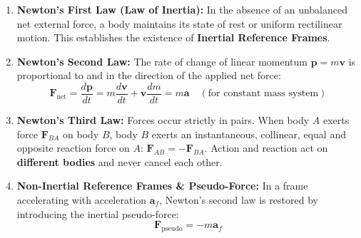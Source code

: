 \documentclass[10pt,twoside,openright]{book}
\begin{document}
\begin{conceptbox}
\begin{enumerate}[leftmargin=*]
  \item \textbf{Newton's First Law (Law of Inertia):} In the absence of an unbalanced net external force, a body maintains its state of rest or uniform rectilinear motion. This establishes the existence of \textbf{Inertial Reference Frames}.
  \item \textbf{Newton's Second Law:} The rate of change of linear momentum $\mathbf{p} = m\mathbf{v}$ is proportional to and in the direction of the applied net force:
  \begin{equation}
    \mathbf{F}_{\text{net}} = \frac{d\mathbf{p}}{dt} = m\frac{d\mathbf{v}}{dt} + \mathbf{v}\frac{dm}{dt} = m\mathbf{a} \quad (\text{for constant mass system})
  \end{equation}
  \item \textbf{Newton's Third Law:} Forces occur strictly in pairs. When body $A$ exerts force $\mathbf{F}_{BA}$ on body $B$, body $B$ exerts an instantaneous, collinear, equal and opposite reaction force on $A$: $\mathbf{F}_{AB} = -\mathbf{F}_{BA}$. Action and reaction act on \textbf{different bodies} and never cancel each other.
  \item \textbf{Non-Inertial Reference Frames \& Pseudo-Force:} In a frame accelerating with acceleration $\mathbf{a}_f$, Newton's second law is restored by introducing the inertial pseudo-force:
  \begin{equation}
    \mathbf{F}_{\text{pseudo}} = -m\mathbf{a}_f
  \end{equation}
\end{enumerate}
\end{conceptbox}
\end{document}
